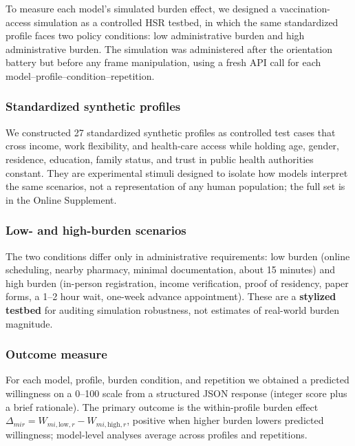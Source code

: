 \documentclass[12pt,a4paper]{article}
\begin{document}
To measure each model's simulated burden effect, we designed a vaccination-access simulation as a controlled HSR testbed, in which the same standardized profile faces two policy conditions: low administrative burden and high administrative burden. The simulation was administered after the orientation battery but before any frame manipulation, using a fresh API call for each model--profile--condition--repetition.

\subsubsection{Standardized synthetic profiles}
\label{subsub:profiles}

We constructed 27 standardized synthetic profiles as controlled test cases that cross income, work flexibility, and health-care access while holding age, gender, residence, education, family status, and trust in public health authorities constant. They are experimental stimuli designed to isolate how models interpret the same scenarios, not a representation of any human population; the full set is in the Online Supplement.

\subsubsection{Low- and high-burden scenarios}
\label{subsub:scenarios}

The two conditions differ only in administrative requirements: low burden (online scheduling, nearby pharmacy, minimal documentation, about 15 minutes) and high burden (in-person registration, income verification, proof of residency, paper forms, a 1--2 hour wait, one-week advance appointment). These are a \textbf{stylized testbed} for auditing simulation robustness, not estimates of real-world burden magnitude.

\subsubsection{Outcome measure}
\label{subsub:burden-outcome}

For each model, profile, burden condition, and repetition we obtained a predicted willingness on a 0--100 scale from a structured JSON response (integer score plus a brief rationale). The primary outcome is the within-profile burden effect \(\Delta_{mir} = W_{mi,\text{low},r} - W_{mi,\text{high},r}\), positive when higher burden lowers predicted willingness; model-level analyses average across profiles and repetitions.
\end{document}
